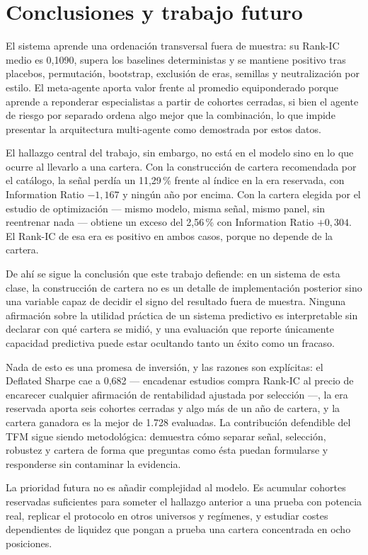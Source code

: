 \chapter{Conclusiones y trabajo futuro}

El sistema aprende una ordenación transversal fuera de muestra: su Rank-IC medio es 0,1090, supera
los baselines deterministas y se mantiene positivo tras placebos, permutación, bootstrap, exclusión
de eras, semillas y neutralización por estilo. El meta-agente aporta valor frente al promedio
equiponderado porque aprende a reponderar especialistas a partir de cohortes cerradas, si bien el
agente de riesgo por separado ordena algo mejor que la combinación, lo que impide presentar la
arquitectura multi-agente como demostrada por estos datos.

El hallazgo central del trabajo, sin embargo, no está en el modelo sino en lo que ocurre al llevarlo
a una cartera. Con la construcción de cartera recomendada por el catálogo, la señal perdía un
11,29\,\% frente al índice en la era reservada, con Information Ratio $-1{,}167$ y ningún año por
encima. Con la cartera elegida por el estudio de optimización --- mismo modelo, misma señal, mismo
panel, sin reentrenar nada --- obtiene un exceso del 2,56\,\% con Information Ratio $+0{,}304$. El
Rank-IC de esa era es positivo en ambos casos, porque no depende de la cartera.

De ahí se sigue la conclusión que este trabajo defiende: en un sistema de esta clase, la
construcción de cartera no es un detalle de implementación posterior sino una variable capaz de
decidir el signo del resultado fuera de muestra. Ninguna afirmación sobre la utilidad práctica de un
sistema predictivo es interpretable sin declarar con qué cartera se midió, y una evaluación que
reporte únicamente capacidad predictiva puede estar ocultando tanto un éxito como un fracaso.

Nada de esto es una promesa de inversión, y las razones son explícitas: el Deflated Sharpe cae a
0,682 --- encadenar estudios compra Rank-IC al precio de encarecer cualquier afirmación de
rentabilidad ajustada por selección ---, la era reservada aporta seis cohortes cerradas y algo más
de un año de cartera, y la cartera ganadora es la mejor de 1.728 evaluadas. La contribución
defendible del TFM sigue siendo metodológica: demuestra cómo separar señal, selección, robustez y
cartera de forma que preguntas como ésta puedan formularse y responderse sin contaminar la
evidencia.

La prioridad futura no es añadir complejidad al modelo. Es acumular cohortes reservadas suficientes
para someter el hallazgo anterior a una prueba con potencia real, replicar el protocolo en otros
universos y regímenes, y estudiar costes dependientes de liquidez que pongan a prueba una cartera
concentrada en ocho posiciones.

